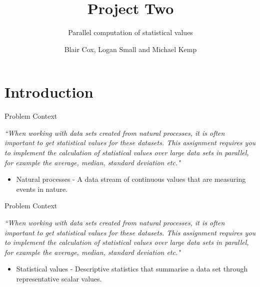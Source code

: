 \documentclass[10pt,aspectratio=169]{beamer} %
\title{Project Two}
\subtitle{Parallel computation of statistical values}
\date{}
\author{Blair Cox, Logan Small and Michael Kemp}
\institute{Group 12 - ParaStats}
\begin{document}
\maketitle



\section{Introduction}
\begin{frame}[t]{Problem Context}
\vspace{3em}

\emph{``When working with data sets created from \alert{natural processes}, it is often important to get statistical values for these datasets. This assignment requires you to implement the calculation of statistical values over large data sets in parallel, for example the average, median, standard deviation etc."}

\vfill
\begin{itemize}
\item \alert{Natural processes} - A data stream of continuous values that are measuring events in nature.
\end{itemize}

\end{frame}

\begin{frame}[t]{Problem Context}
\vspace{3em}

\emph{``When working with data sets created from natural processes, it is often important to get \alert{statistical values} for these datasets. This assignment requires you to implement the calculation of statistical values over large data sets in parallel, for example the average, median, standard deviation etc."}

\vfill
\begin{itemize}
\item \alert{Statistical values} - Descriptive statistics that summarise a data set through representative scalar values.
\end{itemize}

\end{frame}
\end{document}
